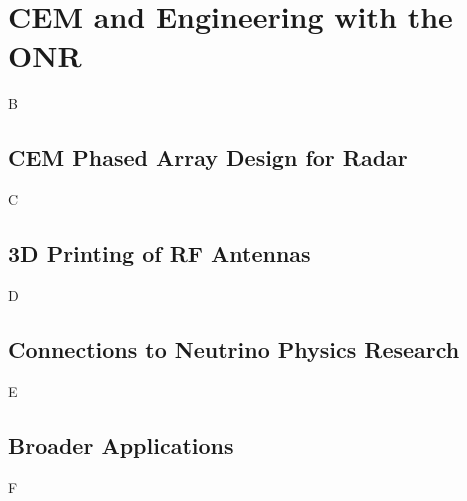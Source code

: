 \documentclass[../../../main.tex]{subfiles}
\begin{document}
\section{CEM and Engineering with the ONR}
\label{sec:naval_research}
B
\subsection{CEM Phased Array Design for Radar}
C
\subsection{3D Printing of RF Antennas}
D
\subsection{Connections to Neutrino Physics Research}
E
\subsection{Broader Applications}
F
\end{document}
